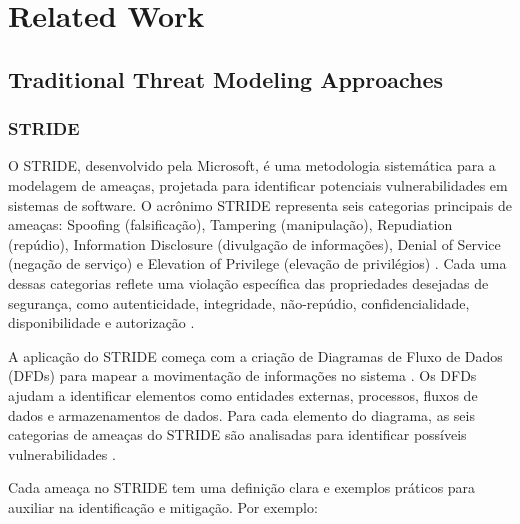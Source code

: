 
%

\chapter{Related Work}
\label{cha:related_work}

\glsresetall

\section{Traditional Threat Modeling Approaches}
\label{sec:traditional_threat_modeling}

\subsection{STRIDE}
\label{subsec:stride}

O STRIDE, desenvolvido pela Microsoft, é uma metodologia sistemática
para a modelagem de ameaças, projetada para identificar potenciais
vulnerabilidades em sistemas de software. O acrônimo STRIDE representa
seis categorias principais de ameaças: Spoofing (falsificação),
Tampering (manipulação), Repudiation (repúdio), Information Disclosure
(divulgação de informações), Denial of Service (negação de serviço) e
Elevation of Privilege (elevação de privilégios)
\cite{ThreatModelingdesigningForSecurity}. Cada uma dessas categorias
reflete uma violação específica das propriedades desejadas de
segurança, como autenticidade, integridade, não-repúdio,
confidencialidade, disponibilidade e autorização
\cite{MicrosoftThreatModelingTechnique}.

A aplicação do STRIDE começa com a criação de Diagramas de Fluxo de
Dados (DFDs) para mapear a movimentação de informações no sistema
\cite{UncoverSecurityDesignFlawsSTRIDE}. Os DFDs ajudam a identificar
elementos como entidades externas, processos, fluxos de dados e
armazenamentos de dados. Para cada elemento do diagrama, as seis
categorias de ameaças do STRIDE são analisadas para identificar
possíveis vulnerabilidades \cite{ThreatModelingdesigningForSecurity}.

Cada ameaça no STRIDE tem uma definição clara e exemplos práticos para
auxiliar na identificação e mitigação. Por exemplo:

